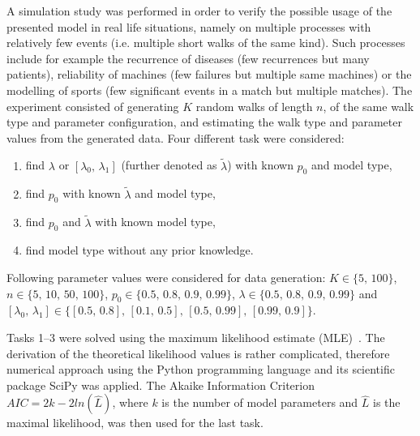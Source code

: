 \documentclass{amsart}
\theoremstyle{definition}
\theoremstyle{plain}
\theoremstyle{plain}
\theoremstyle{plain}
\numberwithin{equation}{section}
\begin{document}
    A simulation study was performed in order to verify the possible usage of the presented model in real life situations, namely on {\color{red}multiple} processes with relatively few events (i.e. {\color{red}multiple} short walks {\color{red}of the same kind}).
    Such processes include for example the recurrence of diseases (few recurrences but many patients), reliability of machines (few failures but multiple same machines) or the modelling of sports (few significant events in a match but multiple matches).
    The experiment consisted of generating $K$ random walks of length $n$, of the same walk type and parameter configuration, and estimating the walk type and parameter values from the generated data.
    Four different task were considered:
    \begin{enumerate}
        \item find $\lambda$ or $[\lambda_{0},\,\lambda_{1}]$ (further denoted as $\tilde{\lambda}$) with known $p_{0}$ and model type,
        \item find $p_{0}$ with known $\tilde{\lambda}$ and model type,
        \item find $p_{0}$ and $\tilde{\lambda}$ with known model type,
        \item find model type without any prior knowledge.
    \end{enumerate}
    Following parameter values were considered for data generation: $K\in\{5,\,100\}$, $n\in\{5,\,10,\,50,\,100\}$, $p_{0}\in\{0.5,\,0.8,\,0.9,\,0.99\}$, $\lambda\in\{0.5,\,0.8,\,0.9,\,0.99\}$ and $[\lambda_{0},\,\lambda_{1}]\in\{[0.5,\,0.8],\,[0.1,\,0.5],\,[0.5,\,0.99],\,[0.99,\,0.9]\}$.


    Tasks 1--3 were solved using the maximum likelihood estimate (MLE)~\cite{rossi2018mathematical}.
    The derivation of the theoretical likelihood values is rather complicated, therefore numerical approach using the Python programming language and its scientific package SciPy was applied.
    The Akaike Information Criterion $AIC=2k-2ln(\hat{L})$, where $k$ is the number of model parameters and $\hat{L}$ is the maximal likelihood, was then used for the last task.
\end{document}
